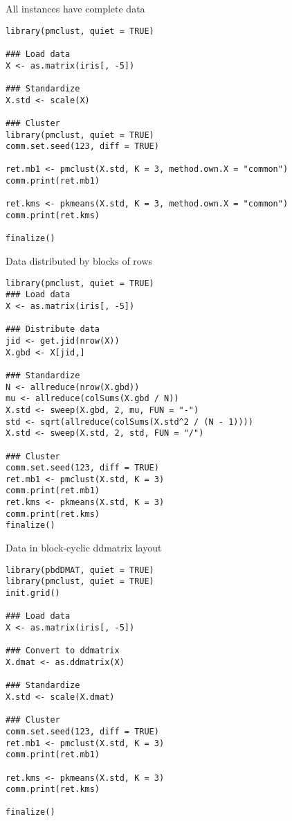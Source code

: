 \begin{frame}[fragile]
  \begin{exampleblock}{All instances have complete data}\pause
    \begin{lstlisting}[title=iris\_common.r]
library(pmclust, quiet = TRUE)

### Load data
X <- as.matrix(iris[, -5])

### Standardize
X.std <- scale(X)

### Cluster
library(pmclust, quiet = TRUE)
comm.set.seed(123, diff = TRUE)

ret.mb1 <- pmclust(X.std, K = 3, method.own.X = "common")
comm.print(ret.mb1)

ret.kms <- pkmeans(X.std, K = 3, method.own.X = "common")
comm.print(ret.kms)

finalize()
    \end{lstlisting} %
  \end{exampleblock}
\end{frame}

\begin{frame}[fragile]
  \begin{exampleblock}{Data distributed by blocks of rows}\pause\small
    \begin{lstlisting}[title=iris\_gbdr.r]
library(pmclust, quiet = TRUE)
### Load data
X <- as.matrix(iris[, -5])

### Distribute data
jid <- get.jid(nrow(X))
X.gbd <- X[jid,]

### Standardize
N <- allreduce(nrow(X.gbd))
mu <- allreduce(colSums(X.gbd / N))
X.std <- sweep(X.gbd, 2, mu, FUN = "-")
std <- sqrt(allreduce(colSums(X.std^2 / (N - 1))))
X.std <- sweep(X.std, 2, std, FUN = "/")

### Cluster
comm.set.seed(123, diff = TRUE)
ret.mb1 <- pmclust(X.std, K = 3)
comm.print(ret.mb1)
ret.kms <- pkmeans(X.std, K = 3)
comm.print(ret.kms)
finalize()
    \end{lstlisting} %
  \end{exampleblock}
\end{frame}

\begin{frame}[fragile]
  \begin{exampleblock}{Data in block-cyclic ddmatrix layout}\pause
    \begin{lstlisting}[title=iris\_dmat.r]
library(pbdDMAT, quiet = TRUE)
library(pmclust, quiet = TRUE)
init.grid()

### Load data
X <- as.matrix(iris[, -5])

### Convert to ddmatrix
X.dmat <- as.ddmatrix(X)

### Standardize
X.std <- scale(X.dmat)

### Cluster
comm.set.seed(123, diff = TRUE)
ret.mb1 <- pmclust(X.std, K = 3)
comm.print(ret.mb1)

ret.kms <- pkmeans(X.std, K = 3)
comm.print(ret.kms)

finalize()
    \end{lstlisting} %
  \end{exampleblock}
\end{frame}

